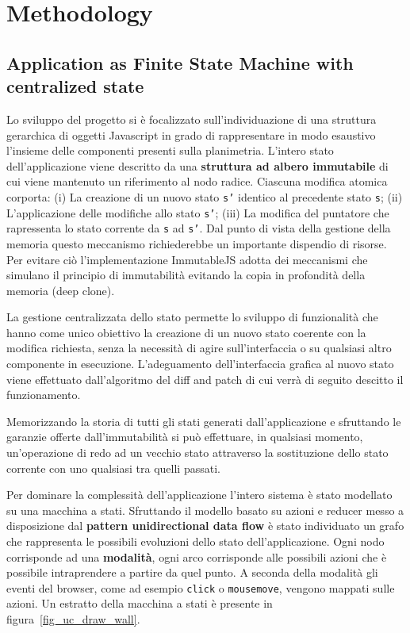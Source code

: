 \section{Methodology}

\subsection{Application as Finite State Machine with centralized state}
Lo sviluppo del progetto si \`e focalizzato sull'individuazione di una struttura gerarchica di oggetti Javascript in grado di rappresentare in modo esaustivo l'insieme delle componenti presenti sulla planimetria. L'intero stato dell'applicazione viene descritto da una \textbf{struttura ad albero immutabile} di cui viene mantenuto un riferimento al nodo radice. Ciascuna modifica atomica corporta: (i) La creazione di un nuovo stato \texttt{s'} identico al precedente stato \texttt{s}; (ii) L'applicazione delle modifiche allo stato \texttt{s'}; (iii) La modifica del puntatore che rapressenta lo stato corrente da \texttt{s} ad \texttt{s'}. Dal punto di vista della gestione della memoria questo meccanismo richiederebbe un importante dispendio di risorse. Per evitare ci\`o l'implementazione ImmutableJS adotta dei meccanismi che simulano il principio di immutabilit\`a evitando la copia in profondit\`a della memoria  (deep clone).

La gestione centralizzata dello stato permette lo sviluppo di funzionalità che hanno come unico obiettivo la creazione di un nuovo stato coerente con la modifica richiesta, senza la necessità di agire sull'interfaccia o su qualsiasi altro componente in esecuzione. L'adeguamento dell'interfaccia grafica al nuovo stato viene effettuato dall'algoritmo del diff and patch di cui verrà di seguito descitto il funzionamento.

Memorizzando la storia di tutti gli stati generati dall'applicazione e sfruttando le garanzie offerte dall'immutabilità si può effettuare, in qualsiasi momento, un'operazione di redo ad un vecchio stato attraverso la sostituzione dello stato corrente con uno qualsiasi tra quelli passati.

Per dominare la complessit\`a dell'applicazione l'intero sistema \`e stato modellato su una macchina a stati. Sfruttando il modello basato su azioni e reducer messo a disposizione dal \textbf{pattern unidirectional data flow} \`e stato individuato un grafo che rappresenta le possibili evoluzioni dello stato dell'applicazione. Ogni nodo corrisponde ad una \textbf{modalit\`a}, ogni arco corrisponde alle possibili azioni che è possibile intraprendere a partire da quel punto. A seconda della modalit\`a gli eventi del browser, come ad esempio \texttt{click} o \texttt{mousemove}, vengono mappati sulle azioni. Un estratto della macchina a stati \`e presente in figura~\ref{fig_uc_draw_wall}.

